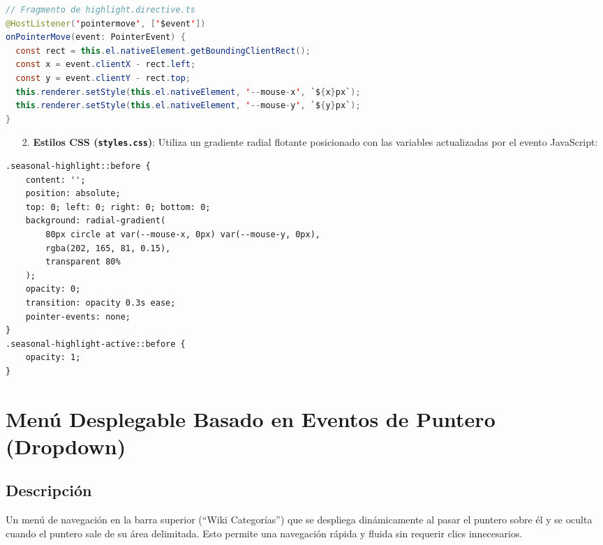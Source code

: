 \documentclass[11pt,a4paper]{article}
\begin{document}
\begin{lstlisting}[language=Java, caption=Fragmento de la directiva highlight.directive.ts en TypeScript]
// Fragmento de highlight.directive.ts
@HostListener('pointermove', ['$event'])
onPointerMove(event: PointerEvent) {
  const rect = this.el.nativeElement.getBoundingClientRect();
  const x = event.clientX - rect.left;
  const y = event.clientY - rect.top;
  this.renderer.setStyle(this.el.nativeElement, '--mouse-x', `${x}px`);
  this.renderer.setStyle(this.el.nativeElement, '--mouse-y', `${y}px`);
}
\end{lstlisting}

\begin{enumerate}
    \item[2.] \textbf{Estilos CSS (\texttt{styles.css})}:
    Utiliza un gradiente radial flotante posicionado con las variables actualizadas por el evento JavaScript:
\end{enumerate}

\begin{lstlisting}[language=HTML, caption=Fragmento de estilos CSS para el spotlight]
.seasonal-highlight::before {
	content: '';
	position: absolute;
	top: 0; left: 0; right: 0; bottom: 0;
	background: radial-gradient(
		80px circle at var(--mouse-x, 0px) var(--mouse-y, 0px),
		rgba(202, 165, 81, 0.15),
		transparent 80%
	);
	opacity: 0;
	transition: opacity 0.3s ease;
	pointer-events: none;
}
.seasonal-highlight-active::before {
	opacity: 1;
}
\end{lstlisting}

\section{Menú Desplegable Basado en Eventos de Puntero (Dropdown)}

\subsection{Descripción}
Un menú de navegación en la barra superior (``Wiki Categorías'') que se despliega dinámicamente al pasar el puntero sobre él y se oculta cuando el puntero sale de su área delimitada. Esto permite una navegación rápida y fluida sin requerir clics innecesarios.
\end{document}
